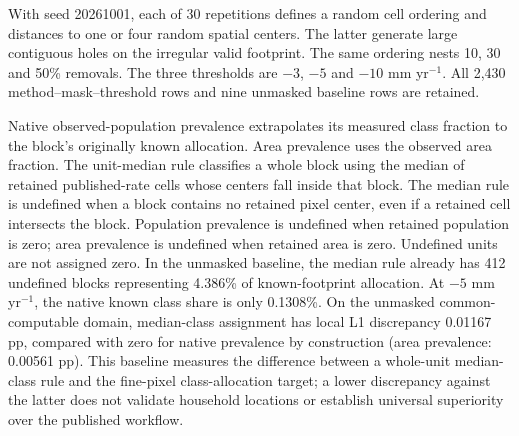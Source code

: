 \documentclass[10pt,a4paper]{article}
\begin{document}
With seed 20261001, each of 30 repetitions defines a random cell ordering and distances to one or four random spatial centers. The latter generate large contiguous holes on the irregular valid footprint. The same ordering nests 10, 30 and 50\% removals. The three thresholds are $-3$, $-5$ and $-10$ mm yr$^{-1}$. All 2,430 method--mask--threshold rows and nine unmasked baseline rows are retained.

Native observed-population prevalence extrapolates its measured class fraction to the block's originally known allocation. Area prevalence uses the observed area fraction. The unit-median rule classifies a whole block using the median of retained published-rate cells whose centers fall inside that block. The median rule is undefined when a block contains no retained pixel center, even if a retained cell intersects the block. Population prevalence is undefined when retained population is zero; area prevalence is undefined when retained area is zero. Undefined units are not assigned zero. In the unmasked baseline, the median rule already has 412 undefined blocks representing 4.386\% of known-footprint allocation. At $-5$ mm yr$^{-1}$, the native known class share is only 0.1308\%. On the unmasked common-computable domain, median-class assignment has local L1 discrepancy 0.01167 pp, compared with zero for native prevalence by construction (area prevalence: 0.00561 pp). This baseline measures the difference between a whole-unit median-class rule and the fine-pixel class-allocation target; a lower discrepancy against the latter does not validate household locations or establish universal superiority over the published workflow.
\end{document}
